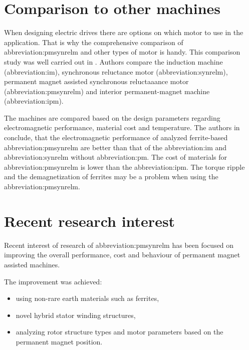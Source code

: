 \documentclass[a4paper, twoside, 11pt]{article}
\begin{document}
\section{Comparison to other machines}
    When designing electric drives there are options on which motor to use in the application. That is why the comprehensive comparison of \gls{abbreviation:pmsynrelm} and other types of motor is handy. This comparison study was well carried out in \cite{zhang-Comprehensive-Comparative-Study-on-Permanent-Magnet-Assisted-Synchronous-Reluctance-Motors-and-Other-Types-of-Motor}. Authors compare the induction machine (\gls{abbreviation:im}), synchronous reluctance motor (\gls{abbreviation:synrelm}), permanent magnet assisted synchronous reluctaaance motor (\gls{abbreviation:pmsynrelm}) and interior permanent-magnet machine (\gls{abbreviation:ipm}).\par
    The machines are compared based on the design parameters regarding electromagnetic performance, material cost and temperature. The authors in \cite{zhang-Comprehensive-Comparative-Study-on-Permanent-Magnet-Assisted-Synchronous-Reluctance-Motors-and-Other-Types-of-Motor} conclude, that the electromagnetic performance of analyzed ferrite-based \gls{abbreviation:pmsynrelm} are better than that of the \gls{abbreviation:im} and \gls{abbreviation:synrelm} without \gls{abbreviation:pm}. The cost of materials for \gls{abbreviation:pmsynrelm} is lower than the \gls{abbreviation:ipm}. The torque ripple and the demagnetization of ferrites may be a problem when using the \gls{abbreviation:pmsynrelm}. \cite{zhang-Comprehensive-Comparative-Study-on-Permanent-Magnet-Assisted-Synchronous-Reluctance-Motors-and-Other-Types-of-Motor}
\section{Recent research interest}
    Recent interest of research of \gls{abbreviation:pmsynrelm} has been focused on improving the overall performance, cost and behaviour of permanent magnet assisted machines.\par
    The improvement was achieved:
        \begin{itemize}
        \item using non-rare earth materials such as ferrites,
        \item novel hybrid stator winding structures,
        \item analyzing rotor structure types and motor parameters based on the permanent magnet position.
        \end{itemize}
\end{document}

